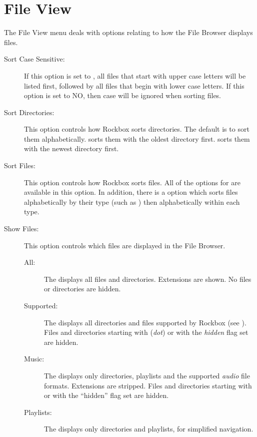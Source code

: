\section{File View}
The File View menu deals with options relating to how the File Browser 
displays files.
%
\begin{description}
\item[Sort Case Sensitive:]
  If this option is set to , all files that start with upper case 
  letters will be listed first, followed by all files that begin with lower 
  case letters.  If this option is set to NO, then case will be ignored when 
  sorting files.
\item[Sort Directories:]
  This option controls how Rockbox sorts directories.  The default is to sort 
  them alphabetically.  sorts them with the oldest directory first. 
   sorts them with the newest directory first.
  
\item[Sort Files:]
  This option controls how Rockbox sorts files.  All of the options for 
   are available in this option.  In addition, there 
  is a  option which sorts files alphabetically by their type 
  (such as ) then alphabetically within each type.

  
\item[\label{ref:ShowFiles}Show Files:]
  This option controls which files are displayed in the File Browser.
  \begin{description}
  \item[All:] The  displays all files and directories.
    Extensions are shown. No files or directories are hidden.
  \item[Supported:] The  displays all directories and
    files supported by Rockbox (see ).
    Files and directories starting with  (\emph{dot}) or with the 
    \emph{hidden} flag set are hidden.
  \item[Music:] The  displays only directories, playlists and
    the supported \emph{audio} file formats. Extensions are stripped. Files and
    directories starting with  or with the ``hidden'' flag set are
    hidden.
  \item[Playlists:] The  displays only directories and playlists,
    for simplified navigation.
  \end{description}


\end{description}
